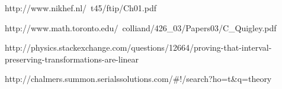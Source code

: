 http://www.nikhef.nl/~t45/ftip/Ch01.pdf %

http://www.math.toronto.edu/~colliand/426_03/Papers03/C_Quigley.pdf %

http://physics.stackexchange.com/questions/12664/proving-that-interval-preserving-transformations-are-linear %

http://chalmers.summon.serialssolutions.com/#!/search?ho=t&q=theory%